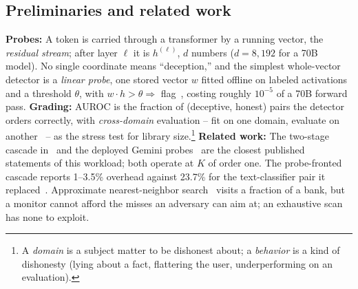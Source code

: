 \documentclass[conference]{IEEEtran}
\newcommand{\auroc}{{AUROC}\xspace}
\begin{document}
\subsection{Preliminaries and related work}
\label{subsec:Probes}
\label{subsec:RelatedWork}
\textbf{Probes:} A token is carried through a transformer by a
running vector, the \emph{residual stream}; after layer $\ell$ it is
$h^{(\ell)}$, $d$ numbers ($d=8{,}192$ for a 70B model). No single
coordinate means ``deception,'' and the simplest whole-vector
detector is a \emph{linear probe}, one stored vector $w$ fitted
offline on labeled activations and a threshold $\theta$, with
$w \cdot h > \theta \Rightarrow$
flag~\cite{marks2023geometry,burns2023ccs,zou2023repe}, costing
roughly $10^{-5}$ of a 70B forward pass.
\textbf{Grading:} \auroc is the fraction of (deceptive, honest) pairs
the detector orders correctly, with
\emph{cross-domain} evaluation -- fit on one domain, evaluate on
another~\cite{ying2026spectrum} -- as the stress test for
library size.\footnote{A \emph{domain} is a subject matter to be
dishonest about; a \emph{behavior} is a kind of dishonesty (lying
about a fact, flattering the user, underperforming on an
evaluation).}
\textbf{Related work:} The two-stage cascade
in~\cite{ccpp2026,anthropic2026ccblog} and the deployed Gemini
probes~\cite{gemini2026probes} are the closest published statements
of this workload; both operate at $K$ of order one. The
probe-fronted cascade reports 1--3.5\% overhead against 23.7\% for
the text-classifier pair it replaced~\cite{cc2025,ccpp2026}.
Approximate
nearest-neighbor search~\cite{charikar2002simhash,malkov2020hnsw}
visits a fraction of a bank, but a monitor cannot afford the misses
an adversary can aim at; an exhaustive scan has none to exploit.

\end{document}

